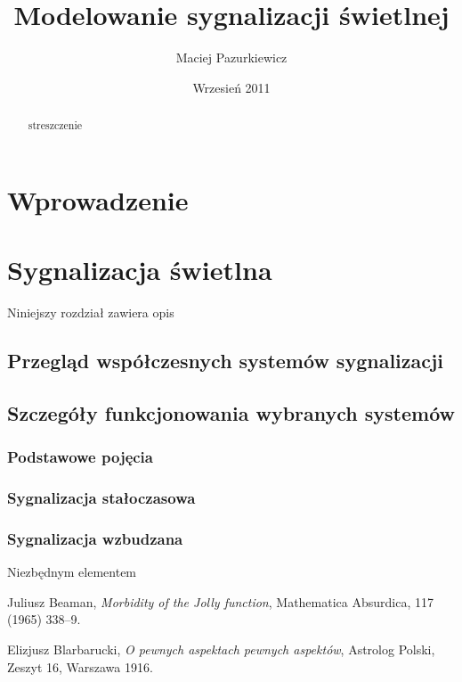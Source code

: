 \documentclass{pracamgr}
\author{Maciej Pazurkiewicz}
\title{Modelowanie sygnalizacji świetlnej}
\date{Wrzesień 2011}
\begin{document}
\maketitle

\begin{abstract}
streszczenie
\end{abstract}

\tableofcontents

\chapter*{Wprowadzenie}

\chapter{Sygnalizacja świetlna}
\label{c:sygnalizacja}

Niniejszy rozdział zawiera opis 

\section{Przegląd współczesnych systemów sygnalizacji}
\label{s:przegląd}

\section{Szczegóły funkcjonowania wybranych systemów}
\label{s:szczegóły}

\subsection{Podstawowe pojęcia}
\label{ss:pojecia}

\subsection{Sygnalizacja stałoczasowa}
\subsection{Sygnalizacja wzbudzana}

Niezbędnym elementem


\begin{thebibliography}{99}

 Juliusz Beaman, \textit{Morbidity of the Jolly
    function}, Mathematica Absurdica, 117 (1965) 338--9.

 Elizjusz Blarbarucki, \textit{O pewnych
    aspektach pewnych aspektów}, Astrolog Polski, Zeszyt 16, Warszawa
  1916.
\end{thebibliography}
\end{document}
